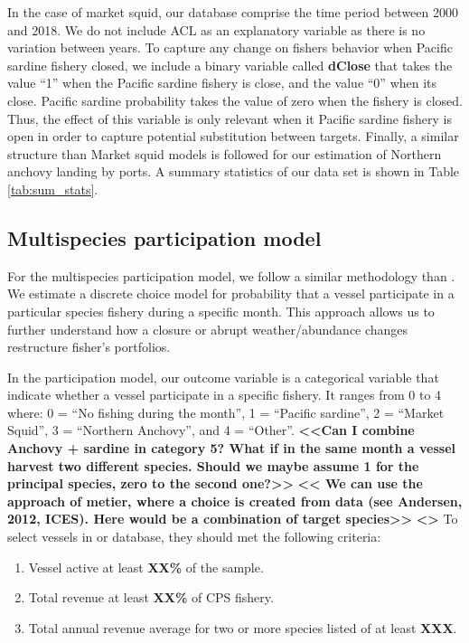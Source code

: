 \documentclass[
]{article}
\providecommand{\tightlist}{%
  \setlength{\itemsep}{0pt}\setlength{\parskip}{0pt}}
\begin{document}
In the case of market squid, our database comprise the time period
between 2000 and 2018. We do not include ACL as an explanatory variable
as there is no variation between years. To capture any change on fishers
behavior when Pacific sardine fishery closed, we include a binary
variable called \textbf{dClose} that takes the value ``1'' when the
Pacific sardine fishery is close, and the value ``0'' when its close.
Pacific sardine probability takes the value of zero when the fishery is
closed. Thus, the effect of this variable is only relevant when it
Pacific sardine fishery is open in order to capture potential
substitution between targets. Finally, a similar structure than Market
squid models is followed for our estimation of Northern anchovy landing
by ports. A summary statistics of our data set is shown in Table
\ref{tab:sum_stats}.

\hypertarget{multispecies-participation-model}{%
\subsection{Multispecies participation
model}\label{multispecies-participation-model}}

For the multispecies participation model, we follow a similar
methodology than \citet{richerson2017}. We estimate a discrete choice
model for probability that a vessel participate in a particular species
fishery during a specific month. This approach allows us to further
understand how a closure or abrupt weather/abundance changes restructure
fisher's portfolios.

In the participation model, our outcome variable is a categorical
variable that indicate whether a vessel participate in a specific
fishery. It ranges from 0 to 4 where: 0 = ``No fishing during the
month'', 1 = ``Pacific sardine'', 2 = ``Market Squid'', 3 = ``Northern
Anchovy'', and 4 = ``Other''. \textbf{\textless\textless Can I combine
Anchovy + sardine in category 5? What if in the same month a vessel
harvest two different species. Should we maybe assume 1 for the
principal species, zero to the second one?\textgreater\textgreater{}}
\textbf{\textless\textless{} We can use the approach of metier, where a
choice is created from data (see Andersen, 2012, ICES). Here would be a
combination of target species\textgreater\textgreater{}}
\textbf{\textless{}\textgreater{}} To select vessels in or database,
they should met the following criteria:

\begin{enumerate}
\def\labelenumi{\arabic{enumi}.}
\tightlist
\item
  Vessel active at least \textbf{XX\%} of the sample.
\item
  Total revenue at least \textbf{XX\%} of CPS fishery.
\item
  Total annual revenue average for two or more species listed of at
  least \textbf{XXX}.
\end{enumerate}
\end{document}
